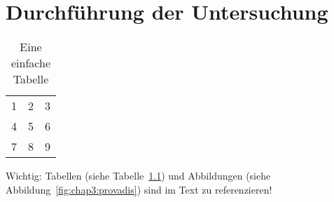 %

\chapter{Durchführung der Untersuchung}

\begin{table}[h]
  \centering
    \begin{tabular}{| l c r |}
    \hline
    1 & 2 & 3 \\
    4 & 5 & 6 \\
    7 & 8 & 9 \\
    \hline
    \end{tabular}
  \caption{Eine einfache Tabelle}
  \label{tab:chap4:simpel}
\end{table}

Wichtig: Tabellen (siehe Tabelle~\ref{tab:chap4:simpel}) und Abbildungen (siehe Abbildung~\ref{fig:chap3:provadis}) sind im Text zu referenzieren!